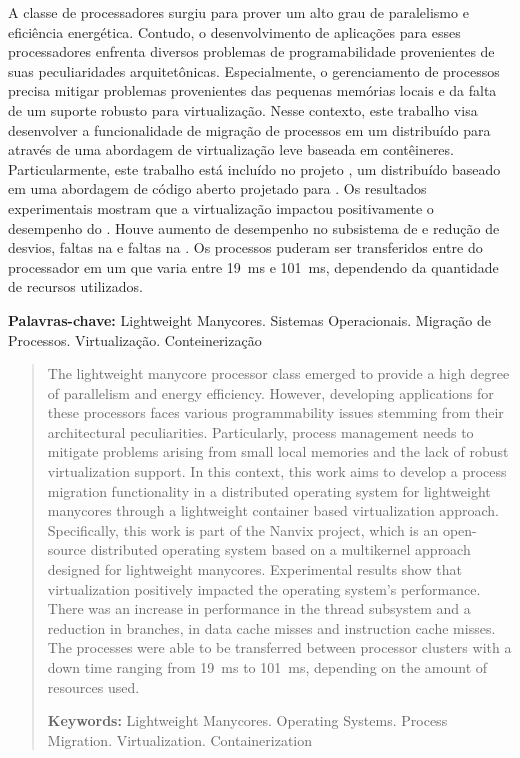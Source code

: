 \begin{resumo}[Resumo]
  A classe de processadores \lw surgiu para prover um alto grau de paralelismo e eficiência energética. Contudo, o desenvolvimento de aplicações para esses processadores enfrenta diversos problemas de programabilidade provenientes de suas peculiaridades arquitetônicas. Especialmente, o gerenciamento de processos precisa mitigar problemas provenientes das pequenas memórias locais e da falta de um suporte robusto para virtualização. Nesse contexto, este trabalho visa desenvolver a funcionalidade de migração de processos em um \os distribuído para \lws através de uma abordagem de virtualização leve baseada em contêineres. Particularmente, este trabalho está incluído no projeto \nanvix, um \os distribuído baseado em uma abordagem \multikernel de código aberto projetado para \lws. Os resultados experimentais mostram que a virtualização impactou positivamente o desempenho do \so. Houve aumento de desempenho no subsistema de \threads e redução de desvios, faltas na \dcache e faltas na \icache. Os processos puderam ser transferidos entre \clusters do processador em um \downtime que varia entre 19~ms e 101~ms, dependendo da quantidade de recursos utilizados.

  \vspace{\baselineskip} 
  \textbf{Palavras-chave:} Lightweight Manycores. Sistemas Operacionais. Migração de Processos. Virtualização. Conteinerização
\end{resumo}

\begin{abstract}
  
The lightweight manycore processor class emerged to provide a high degree of parallelism and energy efficiency. However, developing applications for these processors faces various programmability issues stemming from their architectural peculiarities. Particularly, process management needs to mitigate problems arising from small local memories and the lack of robust virtualization support. In this context, this work aims to develop a process migration functionality in a distributed operating system for lightweight manycores through a lightweight container based virtualization approach. Specifically, this work is part of the Nanvix project, which is an open-source  distributed operating system based on a multikernel approach designed for lightweight manycores. Experimental results show that virtualization positively impacted the operating system's performance. There was an increase in performance in the thread subsystem and a reduction in branches, in data cache misses and instruction cache misses. The processes were able to be transferred between processor clusters with a down time ranging from 19~ms to 101~ms, depending on the amount of resources used.

  \vspace{\baselineskip} 
  \textbf{Keywords:} Lightweight Manycores. Operating Systems. Process Migration. Virtualization. Containerization
\end{abstract}